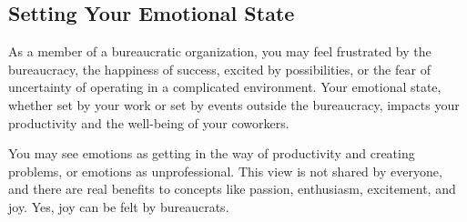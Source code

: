 \subsection{Setting Your Emotional State}

As a member of a bureaucratic organization, you may feel frustrated by the bureaucracy, the happiness of success, excited by possibilities, or the fear of uncertainty of operating in a complicated environment. Your emotional state, whether set by your work or set by events outside the bureaucracy, impacts your productivity and the well-being of your coworkers. 

You may see emotions as getting in the way of productivity and creating problems, or emotions as unprofessional. This view is not shared by everyone, and there are real benefits to concepts like passion, enthusiasm, excitement, and joy. Yes, joy can be felt by bureaucrats. 